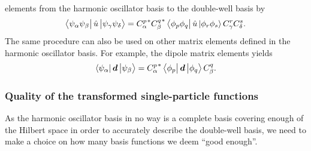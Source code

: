         elements from the harmonic oscillator basis to the double-well basis by
        \begin{align}
            \bra{\psi_{\alpha} \psi_{\beta}}
            \hat{u}
            \ket{\psi_{\gamma} \psi_{\delta}}
            = {C^{p}_{\alpha}}^{*}
            {C^{q}_{\beta}}^{*}
            \bra{\phi_{p} \phi_{q}}
            \hat{u}
            \ket{\phi_{r} \phi_{s}}
            C^{r}_{\gamma}
            C^{s}_{\delta}.
        \end{align}
        The same procedure can also be used on other matrix elements defined in
        the harmonic oscillator basis. For example, the dipole matrix elements
        yields
        \begin{align}
            \bra{\psi_{\alpha}}
            \boldsymbol{d}
            \ket{\psi_{\beta}}
            = {C^{p}_{\alpha}}^{*}
            \bra{\phi_{p}}
            \boldsymbol{d}
            \ket{\phi_{q}}
            C^{q}_{\beta}.
        \end{align}

        \subsubsection{Quality of the transformed single-particle functions}
            As the harmonic oscillator basis in no way is a complete basis
            covering enough of the Hilbert space in order to accurately describe
            the double-well basis, we need to make a choice on how many basis
            functions we deem ``good enough''.
